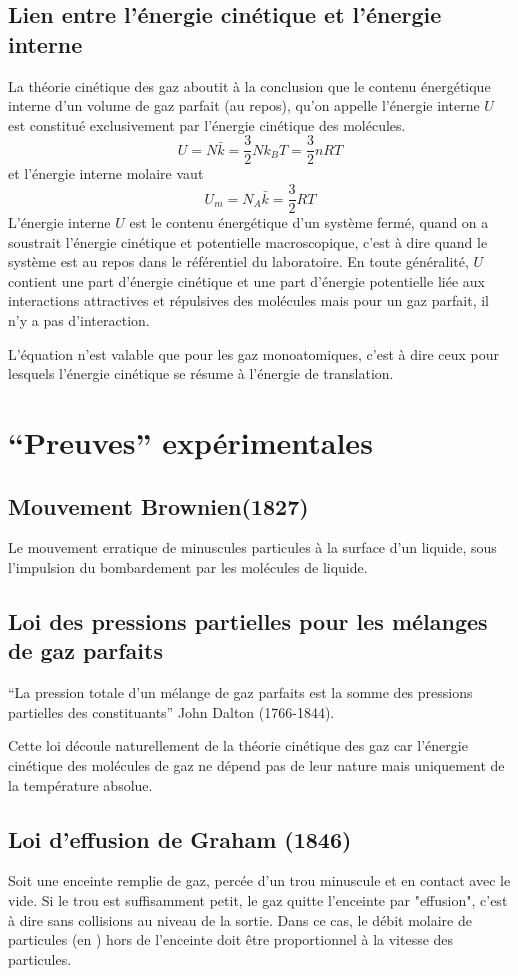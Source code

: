\subsection{Lien entre l'énergie cinétique et l'énergie interne}
La théorie cinétique des gaz aboutit à la conclusion que
le contenu énergétique interne d'un volume de gaz parfait (au repos),
qu'on appelle l'énergie interne $U$ est constitué exclusivement
par l'énergie cinétique des molécules.
\[ U = N\bar k = \frac 32 Nk_BT = \frac 32nRT \]
et l'énergie interne molaire vaut
\[ U_m = N_A\bar k = \frac 32 RT \]
L'énergie interne $U$ est le contenu énergétique d'un système fermé,
quand on a soustrait l'énergie cinétique et potentielle macroscopique,
c'est à dire quand le système est au repos dans le référentiel du laboratoire.
En toute généralité, $U$ contient une part d'énergie cinétique et
une part d'énergie potentielle liée aux interactions attractives et
répulsives des molécules mais pour un gaz parfait, il n'y a pas d'interaction.

L'équation n'est valable que pour les gaz monoatomiques,
c'est à dire ceux pour lesquels l'énergie cinétique se résume à
l'énergie de translation.

\section{``Preuves'' expérimentales}
\subsection{Mouvement Brownien(1827)}
Le mouvement erratique de minuscules particules à la surface d'un liquide,
sous l'impulsion du bombardement par les molécules de liquide.

\subsection{Loi des pressions partielles pour les mélanges de gaz parfaits}
``La pression totale d'un mélange de gaz parfaits est
la somme des pressions partielles des constituants'' John Dalton (1766-1844).

Cette loi découle naturellement de la théorie cinétique des gaz car
l'énergie cinétique des molécules de gaz ne dépend pas de leur nature mais
uniquement de la température absolue.

\subsection{Loi d'effusion de Graham (1846)}
Soit une enceinte remplie de gaz, percée d'un trou minuscule et
en contact avec le vide.
Si le trou est suffisamment petit, le gaz quitte l'enceinte par "effusion",
c'est à dire sans collisions au niveau de la sortie.
Dans ce cas, le débit molaire de particules (\joule en \mole\per\second)
hors de l'enceinte doit être proportionnel à la vitesse des particules.

